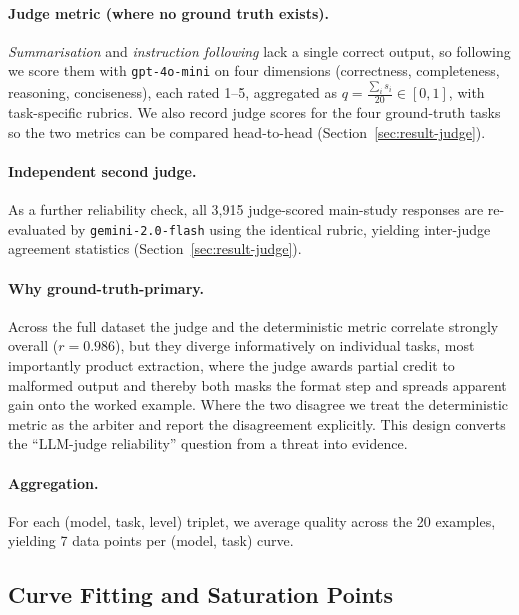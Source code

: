\paragraph{Judge metric (where no ground truth exists).}
\emph{Summarisation} and \emph{instruction following} lack a single correct
output, so following \citet{zheng2023judging} we score them with
\texttt{gpt-4o-mini} on four dimensions (correctness, completeness, reasoning,
conciseness), each rated 1--5, aggregated as
$q = \frac{\sum_i s_i}{20} \in [0,1]$, with task-specific rubrics.
We also record judge scores for the four ground-truth tasks so the two metrics
can be compared head-to-head (Section~\ref{sec:result-judge}).

\paragraph{Independent second judge.}
As a further reliability check, all 3,915 judge-scored main-study responses
are re-evaluated by \texttt{gemini-2.0-flash} using the identical rubric,
yielding inter-judge agreement statistics (Section~\ref{sec:result-judge}).

\paragraph{Why ground-truth-primary.}
Across the full dataset the judge and the deterministic metric correlate
strongly overall ($r = 0.986$), but they diverge informatively on individual
tasks, most importantly product extraction, where the judge awards partial
credit to malformed output and thereby both masks the format step and spreads
apparent gain onto the worked example.
Where the two disagree we treat the deterministic metric as the arbiter and
report the disagreement explicitly.
This design converts the ``LLM-judge reliability'' question from a threat into
evidence.

\paragraph{Aggregation.}
For each (model, task, level) triplet, we average quality across the 20
examples, yielding 7 data points per (model, task) curve.

\subsection{Curve Fitting and Saturation Points}
\label{sec:fitting}

